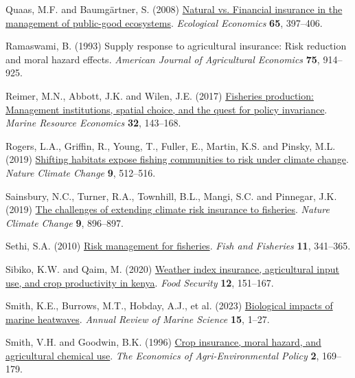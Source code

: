 \documentclass[
  letterpaper,
  DIV=11,
  numbers=noendperiod]{scrartcl}
\newlength{\cslhangindent}
\newlength{\cslentryspacingunit} %
\newenvironment{CSLReferences}[2] %
 {%
  \setlength{\parindent}{0pt}
  \ifodd #1
  \let\oldpar\par
  \def\par{\hangindent=\cslhangindent\oldpar}
  \fi
  \setlength{\parskip}{#2\cslentryspacingunit}
 }%
 {}
\theoremstyle{plain}
\theoremstyle{plain}
\theoremstyle{remark}
\begin{document}
\begin{CSLReferences}{1}{0}
\leavevmode{}%
Quaas, M.F. and Baumgärtner, S. (2008)
\href{https://doi.org/10.1016/j.ecolecon.2007.07.004}{Natural vs.
Financial insurance in the management of public-good ecosystems}.
\emph{Ecological Economics} \textbf{65}, 397--406.

\leavevmode{}%
Ramaswami, B. (1993) Supply response to agricultural insurance: Risk
reduction and moral hazard effects. \emph{American Journal of
Agricultural Economics} \textbf{75}, 914--925.

\leavevmode{}%
Reimer, M.N., Abbott, J.K. and Wilen, J.E. (2017)
\href{https://doi.org/10.1086/690678}{Fisheries production: Management
institutions, spatial choice, and the quest for policy invariance}.
\emph{Marine Resource Economics} \textbf{32}, 143--168.

\leavevmode{}%
Rogers, L.A., Griffin, R., Young, T., Fuller, E., Martin, K.S. and
Pinsky, M.L. (2019)
\href{https://doi.org/10.1038/s41558-019-0503-z}{Shifting habitats
expose fishing communities to risk under climate change}. \emph{Nature
Climate Change} \textbf{9}, 512--516.

\leavevmode{}%
Sainsbury, N.C., Turner, R.A., Townhill, B.L., Mangi, S.C. and Pinnegar,
J.K. (2019) \href{https://doi.org/10.1038/s41558-019-0645-z}{The
challenges of extending climate risk insurance to fisheries}.
\emph{Nature Climate Change} \textbf{9}, 896--897.

\leavevmode{}%
Sethi, S.A. (2010)
\href{https://doi.org/10.1111/j.1467-2979.2010.00363.x}{Risk management
for fisheries}. \emph{Fish and Fisheries} \textbf{11}, 341--365.

\leavevmode{}%
Sibiko, K.W. and Qaim, M. (2020)
\href{https://doi.org/10.1007/s12571-019-00987-y}{Weather index
insurance, agricultural input use, and crop productivity in kenya}.
\emph{Food Security} \textbf{12}, 151--167.

\leavevmode{}%
Smith, K.E., Burrows, M.T., Hobday, A.J., et al. (2023)
\href{https://doi.org/10.1146/annurev-marine-032122-121437}{Biological
impacts of marine heatwaves}. \emph{Annual Review of Marine Science}
\textbf{15}, 1--27.

\leavevmode{}%
Smith, V.H. and Goodwin, B.K. (1996)
\href{https://doi.org/10.2307/1243714}{Crop insurance, moral hazard, and
agricultural chemical use}. \emph{The Economics of Agri-Environmental
Policy} \textbf{2}, 169--179.


\end{CSLReferences}
\end{document}
